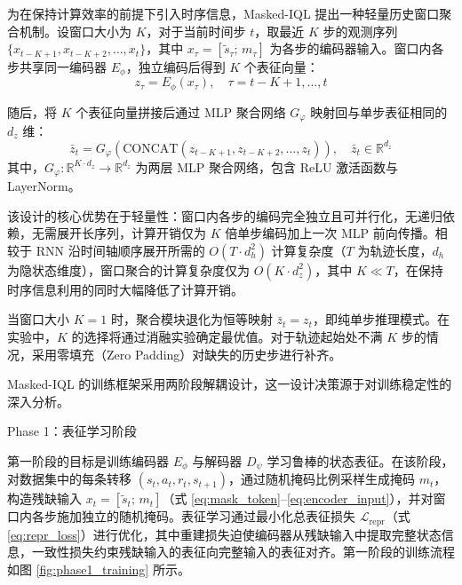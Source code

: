 为在保持计算效率的前提下引入时序信息，Masked-IQL 提出一种轻量历史窗口聚合机制。设窗口大小为 $K$，对于当前时间步 $t$，取最近 $K$ 步的观测序列 $\{x_{t-K+1}, x_{t-K+2}, \ldots, x_t\}$，其中 $x_\tau = [\tilde{s}_\tau;\, m_\tau]$ 为各步的编码器输入。窗口内各步共享同一编码器 $E_\phi$，独立编码后得到 $K$ 个表征向量：
\begin{equation}
    z_\tau = E_\phi(x_\tau), \quad \tau = t-K+1, \ldots, t
\end{equation}

随后，将 $K$ 个表征向量拼接后通过 MLP 聚合网络 $G_\varphi$ 映射回与单步表征相同的 $d_z$ 维：
\begin{equation}
    \bar{z}_t = G_\varphi\!\left(\text{CONCAT}(z_{t-K+1}, z_{t-K+2}, \ldots, z_t)\right), \quad \bar{z}_t \in \mathbb{R}^{d_z}
    \label{eq:window_agg}
\end{equation}
其中，$G_\varphi: \mathbb{R}^{K \cdot d_z} \to \mathbb{R}^{d_z}$ 为两层 MLP 聚合网络，包含 ReLU 激活函数与 LayerNorm。

该设计的核心优势在于轻量性：窗口内各步的编码完全独立且可并行化，无递归依赖，无需展开长序列，计算开销仅为 $K$ 倍单步编码加上一次 MLP 前向传播。相较于 RNN 沿时间轴顺序展开所需的 $O(T \cdot d_h^2)$ 计算复杂度（$T$ 为轨迹长度，$d_h$ 为隐状态维度），窗口聚合的计算复杂度仅为 $O(K \cdot d_z^2)$，其中 $K \ll T$，在保持时序信息利用的同时大幅降低了计算开销。

当窗口大小 $K = 1$ 时，聚合模块退化为恒等映射 $\bar{z}_t = z_t$，即纯单步推理模式。在实验中，$K$ 的选择将通过消融实验确定最优值。对于轨迹起始处不满 $K$ 步的情况，采用零填充（Zero Padding）对缺失的历史步进行补齐。

\label{sec:two_phase}

Masked-IQL 的训练框架采用两阶段解耦设计，这一设计决策源于对训练稳定性的深入分析。

Phase 1：表征学习阶段

第一阶段的目标是训练编码器 $E_\phi$ 与解码器 $D_\psi$ 学习鲁棒的状态表征。在该阶段，对数据集中的每条转移 $(s_t, a_t, r_t, s_{t+1})$，通过随机掩码比例采样生成掩码 $m_t$，构造残缺输入 $x_t = [\tilde{s}_t;\, m_t]$（式 \eqref{eq:mask_token}--\eqref{eq:encoder_input}），并对窗口内各步施加独立的随机掩码。表征学习通过最小化总表征损失 $\mathcal{L}_{\text{repr}}$（式 \eqref{eq:repr_loss}）进行优化，其中重建损失迫使编码器从残缺输入中提取完整状态信息，一致性损失约束残缺输入的表征向完整输入的表征对齐。第一阶段的训练流程如图 \ref{fig:phase1_training} 所示。

